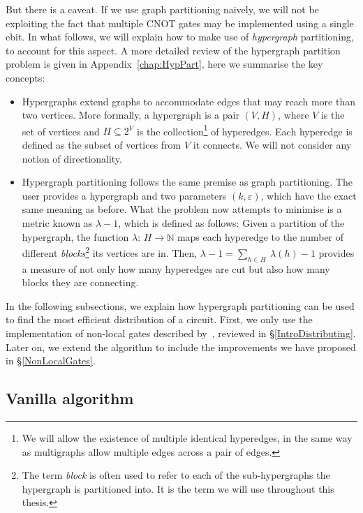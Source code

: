 But there is a caveat. If we use graph partitioning naively, we will not be exploiting the fact that multiple CNOT gates may be implemented using a single ebit. In what follows, we will explain how to make use of \textit{hypergraph} partitioning, to account for this aspect. A more detailed review of the hypergraph partition problem is given in Appendix~\ref{chap:HypPart}, here we summarise the key concepts:

\begin{itemize}
  \item Hypergraphs extend graphs to accommodate edges that may reach more than two vertices. More formally, a hypergraph is a pair \((V,H)\), where \(V\) is the set of vertices and \(H \subseteq 2^V\) is the collection\footnote{We will allow the existence of multiple identical hyperedges, in the same way as multigraphs allow multiple edges across a pair of edges.} of hyperedges. Each hyperedge is defined as the subset of vertices from \(V\) it connects. We will not consider any notion of directionality.
  \item Hypergraph partitioning follows the same premise as graph partitioning. The user provides a hypergraph and two parameters \((k,\varepsilon)\), which have the exact same meaning as before. What the problem now attempts to minimise is a metric known as \(\lambda\!-\!1\), which is defined as follows: Given a partition of the hypergraph, the function \(\lambda\colon\, H \to \mathbb{N}\) maps each hyperedge to the number of different \textit{blocks}\footnote{The term \textit{block} is often used to refer to each of the sub-hypergraphs the hypergraph is partitioned into. It is the term we will use throughout this thesis.} its vertices are in. Then, \(\lambda\!-\!1 = \sum_{h \in H} \ \lambda(h)\!-\! 1\) provides a measure of not only how many hyperedges are cut but also how many blocks they are connecting.
\end{itemize}

In the following subsections, we explain how hypergraph partitioning can be used to find the most efficient distribution of a circuit. First, we only use the implementation of non-local gates described by~\citet{NonLocalCNOT}, reviewed in \S\ref{IntroDistributing}. Later on, we extend the algorithm to include the improvements we have proposed in \S\ref{NonLocalGates}.

\subsection{Vanilla algorithm}
\label{Vanilla}

